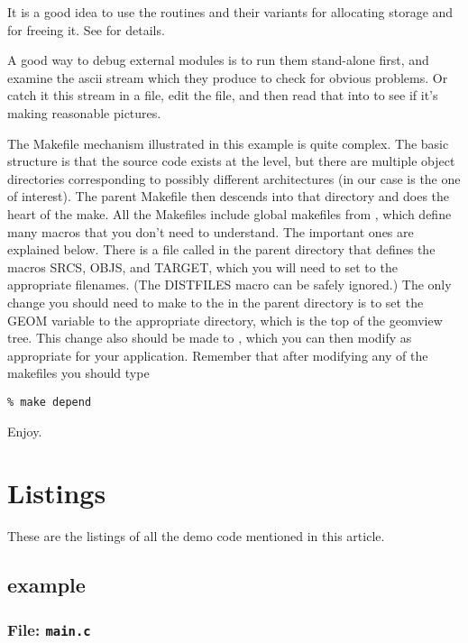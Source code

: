It is a good idea to use the  routines and
their variants for allocating storage and  for
freeing it.  See  for details.

A good way to debug external modules is to run them stand-alone
first, and examine the ascii stream which they produce to
check for obvious problems.  Or catch it this stream in a file, edit the
file, and then read that into  to see if
it's making reasonable pictures.

The Makefile mechanism illustrated in this example is quite complex.
The basic structure is that the source code exists at the
 level, but there are multiple object
directories corresponding to possibly different architectures (in our
case  is the one of interest).  The parent Makefile
then descends into that directory and does the heart of the make.  All
the Makefiles include global makefiles from ,
which define many macros that you don't need to understand. The
important ones are explained below.  There is a file called
 in the parent directory that defines the macros
SRCS, OBJS, and TARGET, which you will need to set to the appropriate
filenames. (The DISTFILES macro can be safely ignored.) The only
change you should need to make to the  in the
parent directory is to set the GEOM variable to the appropriate
directory, which is the top of the geomview tree. This change also
should be made to , which you can then modify
as appropriate for your application. Remember that after modifying any
of the makefiles you should type 
\begin{verbatim} 
% make depend
\end{verbatim}
Enjoy.

\section{Listings}

These are the listings of all the demo code mentioned in this article.

\subsection{example}
\label{ExampleListings}
\subsubsection{File: {\tt main.c}}

